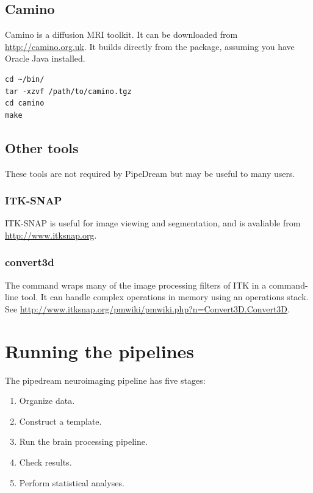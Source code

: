 \documentclass{InsightArticle}
\begin{document}
\subsection{Camino}

Camino is a diffusion MRI toolkit. It can be downloaded from \url{http://camino.org.uk}. It builds directly from the package, assuming you have Oracle Java installed.
\begin{lstlisting}[style=bash]
cd ~/bin/
tar -xzvf /path/to/camino.tgz
cd camino
make
\end{lstlisting}


\subsection{Other tools}

These tools are not required by PipeDream but may be useful to many users.

\subsubsection{ITK-SNAP}

ITK-SNAP is useful for image viewing and segmentation, and is avaliable from \url{http://www.itksnap.org}.

\subsubsection{convert3d}

The  command wraps many of the image processing filters of ITK in a command-line tool. It can handle complex operations in memory using an operations stack. See \url{http://www.itksnap.org/pmwiki/pmwiki.php?n=Convert3D.Convert3D}.
 

\section{Running the pipelines}

The pipedream neuroimaging pipeline has five stages: 
\begin{enumerate}
\item Organize data.
\item Construct a template.  
\item Run the brain processing pipeline.  
\item Check results. 
\item Perform statistical analyses.  
\end{enumerate}
\end{document}
